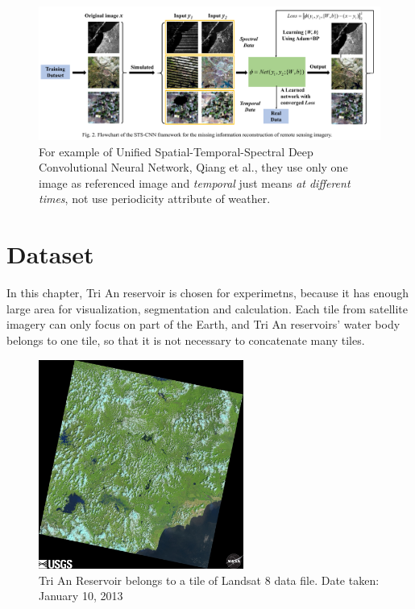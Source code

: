 \begin{figure}[h!]
	\includegraphics[width=1\textwidth]{figures/sts-cnn_framework.png}
	\caption{For example of Unified Spatial-Temporal-Spectral Deep Convolutional Neural Network, Qiang et al., they use only one image as referenced image and \textit{temporal} just means \textit{at different times}, not use periodicity attribute of weather.}
\end{figure}

\section {Dataset}
In this chapter, Tri An reservoir is chosen for experimetns, because it has enough large area for visualization, segmentation and calculation. Each tile from satellite imagery can only focus on part of the Earth, and Tri An reservoirs' water body belongs to one tile, so that it is not necessary to concatenate many tiles.

\begin{figure}[h!]
	\centering
	\includegraphics[width=0.6\textwidth]{figures/l8tile.png}
	\caption{Tri An Reservoir belongs to a tile of Landsat 8 data file. Date taken: January 10, 2013}
\end{figure}	


